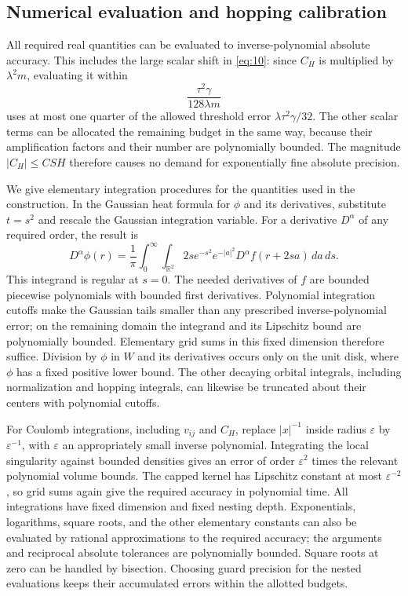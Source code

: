 \subsection{Numerical evaluation and hopping calibration}

All required real quantities can be evaluated to inverse-polynomial
absolute accuracy. This includes the large scalar shift in
\eqref{eq:10}: since $C_H$ is multiplied by $\lambda^2m$, evaluating
it within
\[
             \frac{\tau^2\gamma}{128\lambda m}
\]
uses at most one quarter of the allowed threshold error
$\lambda\tau^2\gamma/32$. The other scalar terms can be allocated
the remaining budget in the same way, because their amplification
factors and their number are polynomially bounded. The magnitude
$|C_H|\le CSH$ therefore causes no demand for exponentially fine
absolute precision.

We give elementary integration procedures for the quantities used in
the construction. In the Gaussian heat formula for $\phi$ and its
derivatives, substitute $t=s^2$ and rescale the Gaussian integration
variable. For a derivative $D^\alpha$ of any required order, the result
is
\[
 D^\alpha\phi(r)=\frac1\pi
 \int_0^\infty\!\int_{\mathbb R^2}
       2s e^{-s^2}e^{-|a|^2}D^\alpha f(r+2sa)\,da\,ds.
\]
This integrand is regular at $s=0$. The needed derivatives of $f$ are
bounded piecewise polynomials with bounded first derivatives. Polynomial
integration cutoffs make the Gaussian tails smaller than any prescribed
inverse-polynomial error; on the remaining domain the integrand and its
Lipschitz bound are polynomially bounded. Elementary grid sums in this
fixed dimension therefore suffice. Division by $\phi$ in $W$ and its
derivatives occurs only on the unit disk, where $\phi$ has a fixed
positive lower bound. The other decaying orbital integrals, including
normalization and hopping integrals, can likewise be truncated about
their centers with polynomial cutoffs.

For Coulomb integrations, including $v_{ij}$ and $C_H$, replace
$|x|^{-1}$ inside radius $\varepsilon$ by $\varepsilon^{-1}$, with
$\varepsilon$ an appropriately small inverse polynomial. Integrating
the local singularity against bounded densities gives an error of order
$\varepsilon^2$ times the relevant polynomial volume bounds. The capped
kernel has Lipschitz constant at most $\varepsilon^{-2}$, so grid sums
again give the required accuracy in polynomial time. All integrations
have fixed dimension and fixed nesting depth. Exponentials, logarithms,
square roots, and the other elementary constants can also be evaluated
by rational approximations to the required accuracy; the arguments and
reciprocal absolute tolerances are polynomially bounded. Square roots
at zero can be handled by bisection. Choosing guard precision for the
nested evaluations keeps their accumulated errors within the allotted
budgets.

